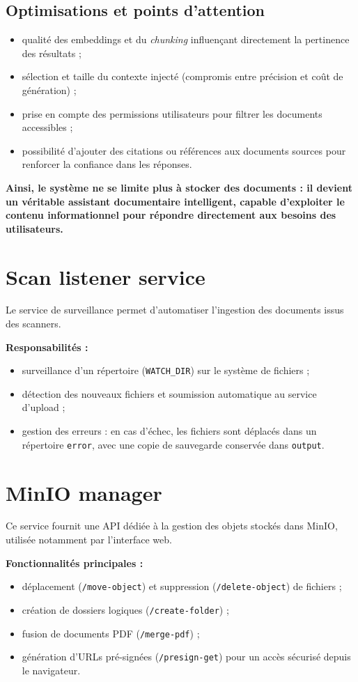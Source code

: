\documentclass[12pt,a4paper]{report}
\begin{document}
\subsection*{Optimisations et points d’attention}
\begin{itemize}
  \item qualité des embeddings et du \textit{chunking} influençant directement la pertinence des résultats ;
  \item sélection et taille du contexte injecté (compromis entre précision et coût de génération) ;
  \item prise en compte des permissions utilisateurs pour filtrer les documents accessibles ;
  \item possibilité d’ajouter des citations ou références aux documents sources pour renforcer la confiance dans les réponses.
\end{itemize}

\textbf{Ainsi, le système ne se limite plus à stocker des documents : il devient un véritable assistant documentaire intelligent, capable d’exploiter le contenu informationnel pour répondre directement aux besoins des utilisateurs.}

\section{Scan listener service}
Le service de surveillance permet d’automatiser l’ingestion des documents issus des scanners.

\textbf{Responsabilités :}
\begin{itemize}
  \item surveillance d’un répertoire (\texttt{WATCH\_DIR}) sur le système de fichiers ;
  \item détection des nouveaux fichiers et soumission automatique au service d’upload ;
  \item gestion des erreurs : en cas d’échec, les fichiers sont déplacés dans un répertoire \texttt{error}, avec une copie de sauvegarde conservée dans \texttt{output}.
\end{itemize}

\section{MinIO manager}
Ce service fournit une API dédiée à la gestion des objets stockés dans MinIO, utilisée notamment par l’interface web.

\textbf{Fonctionnalités principales :}
\begin{itemize}
  \item déplacement (\texttt{/move-object}) et suppression (\texttt{/delete-object}) de fichiers ;
  \item création de dossiers logiques (\texttt{/create-folder}) ;
  \item fusion de documents PDF (\texttt{/merge-pdf}) ;
  \item génération d’URLs pré-signées (\texttt{/presign-get}) pour un accès sécurisé depuis le navigateur.
\end{itemize}
\end{document}
